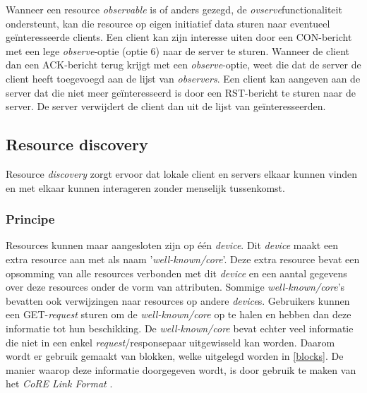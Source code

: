 Wanneer een resource \textit{observable} is of anders gezegd, de \textit{ovserve}functionaliteit ondersteunt, kan die resource op eigen initiatief data sturen naar eventueel ge\"{i}nteresseerde clients. Een client kan zijn interesse uiten door een CON-bericht met een lege \textit{observe}-optie (optie 6) naar de server te sturen. Wanneer de client dan een ACK-bericht terug krijgt met een \textit{observe}-optie, weet die dat de server de client heeft toegevoegd aan de lijst van \textit{observers}. Een client kan aangeven aan de server dat die niet meer ge\"{i}nteresseerd is door een RST-bericht te sturen naar de server. De server verwijdert de client dan uit de lijst van ge\"{i}nteresseerden.

\subsection{Resource discovery} \label{resourceDiscovery}
Resource \textit{discovery} zorgt ervoor dat lokale client en servers elkaar kunnen vinden en met elkaar kunnen interageren zonder menselijk tussenkomst.

\subsubsection{Principe}
\noindent
Resources kunnen maar aangesloten zijn op \'{e}\'{e}n \textit{device}. Dit \textit{device} maakt een extra resource aan met als naam '\textit{well-known/core}'. Deze extra resource bevat een opsomming van alle resources verbonden met dit \textit{device} en een aantal gegevens over deze resources onder de vorm van attributen. Sommige \textit{well-known/core}'s bevatten ook verwijzingen naar resources op andere \textit{device}s. Gebruikers kunnen een GET-\textit{request} sturen om de \textit{well-known/core} op te halen en hebben dan deze informatie tot hun beschikking. De \textit{well-known/core} bevat echter veel informatie die niet in een enkel \textit{request}/responsepaar uitgewisseld kan worden. Daarom wordt er gebruik gemaakt van blokken, welke uitgelegd worden in \ref{blocks}. De manier waarop deze informatie doorgegeven wordt, is door gebruik te maken van het \textit{CoRE Link Format} \cite{coapDiscovery}.

